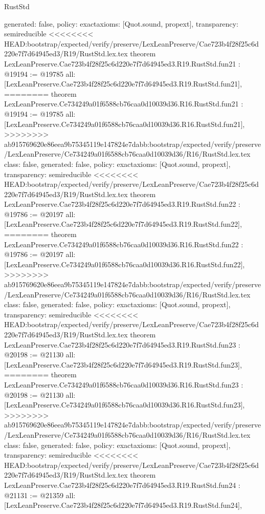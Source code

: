 \begin{lexlean}{RustStd}
\begin{coremodule}
{\begin{coremodule}
{{{{{{{{{{{{{{{{{{{{{{{{  generated: false,
  policy: exact{axioms: [Quot.sound, propext]},
  transparency: semireducible
}
<<<<<<<< HEAD:bootstrap/expected/verify/preserve/LexLeanPreserve/Cae723b4f28f25c6d220e7f7d64945ed3/R19/RustStd.lex.tex
theorem LexLeanPreserve.Cae723b4f28f25c6d220e7f7d64945ed3.R19.RustStd.fun21 : @19194 := @19785 {
  all: [LexLeanPreserve.Cae723b4f28f25c6d220e7f7d64945ed3.R19.RustStd.fun21],
========
theorem LexLeanPreserve.Ce734249a01f6588cb76caa0d10039d36.R16.RustStd.fun21 : @19194 := @19785 {
  all: [LexLeanPreserve.Ce734249a01f6588cb76caa0d10039d36.R16.RustStd.fun21],
>>>>>>>> ab915769620e86eea9b75345119e147824e7dabb:bootstrap/expected/verify/preserve/LexLeanPreserve/Ce734249a01f6588cb76caa0d10039d36/R16/RustStd.lex.tex
  class: false,
  generated: false,
  policy: exact{axioms: [Quot.sound, propext]},
  transparency: semireducible
}
<<<<<<<< HEAD:bootstrap/expected/verify/preserve/LexLeanPreserve/Cae723b4f28f25c6d220e7f7d64945ed3/R19/RustStd.lex.tex
theorem LexLeanPreserve.Cae723b4f28f25c6d220e7f7d64945ed3.R19.RustStd.fun22 : @19786 := @20197 {
  all: [LexLeanPreserve.Cae723b4f28f25c6d220e7f7d64945ed3.R19.RustStd.fun22],
========
theorem LexLeanPreserve.Ce734249a01f6588cb76caa0d10039d36.R16.RustStd.fun22 : @19786 := @20197 {
  all: [LexLeanPreserve.Ce734249a01f6588cb76caa0d10039d36.R16.RustStd.fun22],
>>>>>>>> ab915769620e86eea9b75345119e147824e7dabb:bootstrap/expected/verify/preserve/LexLeanPreserve/Ce734249a01f6588cb76caa0d10039d36/R16/RustStd.lex.tex
  class: false,
  generated: false,
  policy: exact{axioms: [Quot.sound, propext]},
  transparency: semireducible
}
<<<<<<<< HEAD:bootstrap/expected/verify/preserve/LexLeanPreserve/Cae723b4f28f25c6d220e7f7d64945ed3/R19/RustStd.lex.tex
theorem LexLeanPreserve.Cae723b4f28f25c6d220e7f7d64945ed3.R19.RustStd.fun23 : @20198 := @21130 {
  all: [LexLeanPreserve.Cae723b4f28f25c6d220e7f7d64945ed3.R19.RustStd.fun23],
========
theorem LexLeanPreserve.Ce734249a01f6588cb76caa0d10039d36.R16.RustStd.fun23 : @20198 := @21130 {
  all: [LexLeanPreserve.Ce734249a01f6588cb76caa0d10039d36.R16.RustStd.fun23],
>>>>>>>> ab915769620e86eea9b75345119e147824e7dabb:bootstrap/expected/verify/preserve/LexLeanPreserve/Ce734249a01f6588cb76caa0d10039d36/R16/RustStd.lex.tex
  class: false,
  generated: false,
  policy: exact{axioms: [Quot.sound, propext]},
  transparency: semireducible
}
<<<<<<<< HEAD:bootstrap/expected/verify/preserve/LexLeanPreserve/Cae723b4f28f25c6d220e7f7d64945ed3/R19/RustStd.lex.tex
theorem LexLeanPreserve.Cae723b4f28f25c6d220e7f7d64945ed3.R19.RustStd.fun24 : @21131 := @21359 {
  all: [LexLeanPreserve.Cae723b4f28f25c6d220e7f7d64945ed3.R19.RustStd.fun24],
}}}}}}}}}}}}}}}}}}}}}}}}}}}
\end{coremodule}}
\end{coremodule}
\end{lexlean}

